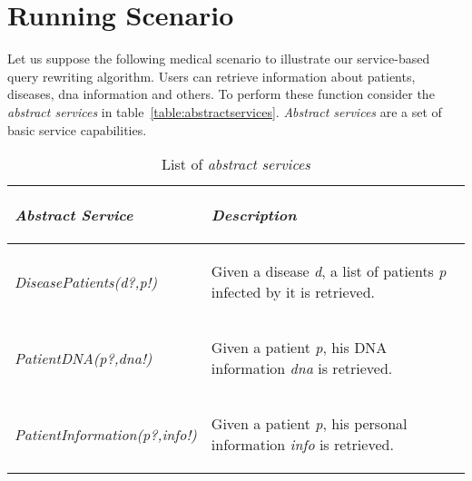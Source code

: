 \section{Running Scenario}
Let us suppose the following medical scenario to illustrate our service-based query rewriting algorithm. Users can retrieve information about patients, diseases, dna information and others.
To perform these function consider the \textit{abstract services} in table~\ref{table:abstractservices}. 
\textit{Abstract services} are a set of basic service capabilities. 

\begin{table}[h!]
\center
\begin{tabular}{|p{3.7cm}|p{4cm}|}
\hline
\begin{small} \textbf{\textit{Abstract Service}} \end{small} & \begin{small}\textbf{\textit{Description}} \end{small}\\ 
\hline 
\begin{small} \textit{DiseasePatients(d?,p!)} \end{small} & \begin{small} Given a disease \textit{d}, a list of patients \textit{p} infected by it is retrieved. \end{small}\\ 
\hline 
\begin{small} \textit{PatientDNA(p?,dna!)} \end{small} & \begin{small} Given a patient \textit{p}, his DNA information \textit{dna} is retrieved. \end{small}\\ 
\hline 
\begin{small} \textit{PatientInformation(p?,info!)} \end{small} & \begin{small} Given a patient \textit{p}, his personal information \textit{info} is retrieved. \end{small}\\ 
\hline 
\end{tabular} \caption{List of \textit{abstract services}}
\end{table}\label{table:abstractservices}

